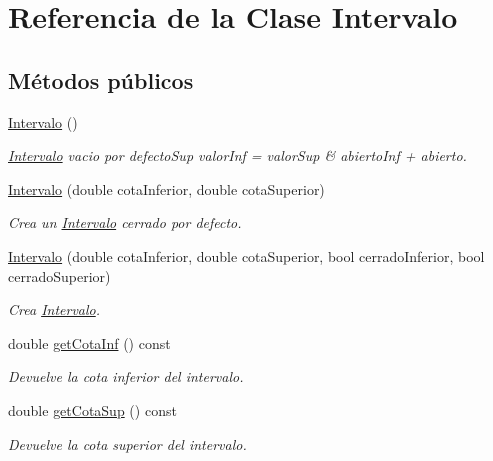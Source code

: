 \hypertarget{classIntervalo}{}\section{Referencia de la Clase Intervalo}
\label{classIntervalo}
\subsection*{Métodos públicos}
\begin{DoxyCompactItemize}
\item 
\hyperlink{classIntervalo_a9b5b23dda7ee26b444898457959cb03d}{Intervalo} ()\hypertarget{classIntervalo_a9b5b23dda7ee26b444898457959cb03d}{}\label{classIntervalo_a9b5b23dda7ee26b444898457959cb03d}

\begin{DoxyCompactList}\small\item\em \hyperlink{classIntervalo}{Intervalo} vacio por defecto\+Sup valor\+Inf = valor\+Sup \& abierto\+Inf + abierto. \end{DoxyCompactList}\item 
\hyperlink{classIntervalo_a321e56ef7e1f4a774bd64cc2609156f4}{Intervalo} (double cota\+Inferior, double cota\+Superior)
\begin{DoxyCompactList}\small\item\em Crea un \hyperlink{classIntervalo}{Intervalo} cerrado por defecto. \end{DoxyCompactList}\item 
\hyperlink{classIntervalo_af70d523399465f51862977a303656c72}{Intervalo} (double cota\+Inferior, double cota\+Superior, bool cerrado\+Inferior, bool cerrado\+Superior)
\begin{DoxyCompactList}\small\item\em Crea \hyperlink{classIntervalo}{Intervalo}. \end{DoxyCompactList}\item 
double \hyperlink{classIntervalo_af8170b68c6d6a63192db6685b90f782f}{get\+Cota\+Inf} () const 
\begin{DoxyCompactList}\small\item\em Devuelve la cota inferior del intervalo. \end{DoxyCompactList}\item 
double \hyperlink{classIntervalo_a7f8ff94ce16f90a81a3c55f36044893b}{get\+Cota\+Sup} () const 
\begin{DoxyCompactList}\small\item\em Devuelve la cota superior del intervalo. \end{DoxyCompactList}\item 

\end{DoxyCompactItemize}
